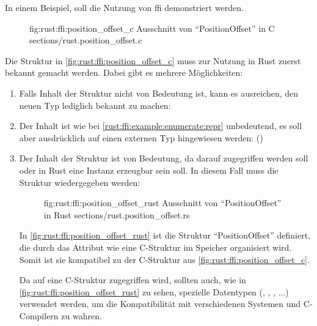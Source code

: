 In einem Beispiel, soll die Nutzung von \gls{ffi} demonstriert werden.

\begin{figure}[H]
	\ccinclude
		{fig:rust:ffi:position_offset_c}
		{Ausschnitt von \enquote{PositionOffset}  in C}
		{sections/rust.position_offset.c}
	
\end{figure}

Die Struktur in \autoref{fig:rust:ffi:position_offset_c} muss zur Nutzung in Rust zuerst bekannt gemacht werden.
Dabei gibt es mehrere Möglichkeiten:
\begin{enumerate}
	\item Falls Inhalt der Struktur nicht von Bedeutung ist, kann es ausreichen, den neuen Typ lediglich bekannt zu machen:  \label{rust:ffi:example:enumerate:repr}
	
	\item Der Inhalt ist wie bei \autoref{rust:ffi:example:enumerate:repr} unbedeutend, es soll aber ausdrücklich auf einen externen Typ hingewiesen werden:  \cite{rust:github:extern_type} ()
	
	\item Der Inhalt der Struktur ist von Bedeutung, da darauf zugegriffen werden soll oder in Rust eine Instanz erzeugbar sein soll. In diesem Fall muss die Struktur wiedergegeben werden:
	\begin{figure}[H]
		\rustcinclude
			{fig:rust:ffi:position_offset_rust}
			{Ausschnitt von \enquote{PositionOffset}  in Rust}
			{sections/rust.position_offset.rs}
	\end{figure}
	
	In \autoref{fig:rust:ffi:position_offset_rust} ist die Struktur \enquote{PositionOffset} definiert,
	die durch das Attribut  wie eine C-Struktur im Speicher organisiert wird.
	Somit ist sie kompatibel zu der C-Struktur aus \autoref{fig:rust:ffi:position_offset_c}.
	
	Da auf eine C-Struktur zugegriffen wird, sollten auch, wie in \autoref{fig:rust:ffi:position_offset_rust} zu sehen, spezielle Datentypen (, , , ...) verwendet werden, um die Kompatibilität mit verschiedenen Systemen und C-Compilern zu wahren. 
	
	

\end{enumerate}
